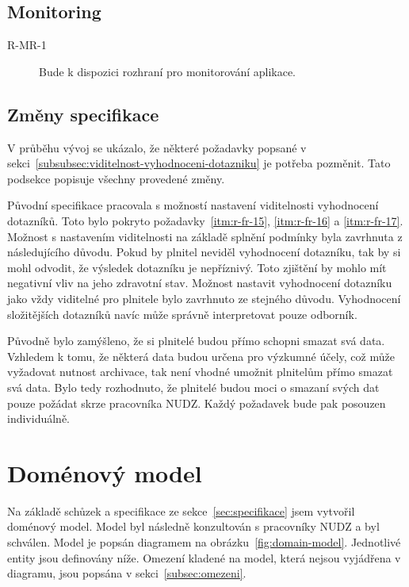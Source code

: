 \subsection{Monitoring}\label{subsec:monitoring}

\begin{description}
    \item[R-MR-1]
    Bude k dispozici rozhraní pro monitorování aplikace.
\end{description}

\subsection{Změny specifikace}\label{subsec:zmeny-specifikace}

V průběhu vývoj se ukázalo, že některé požadavky popsané v sekci~\ref{subsubsec:viditelnost-vyhodnoceni-dotazniku} je potřeba pozměnit.
Tato podsekce popisuje všechny provedené změny.

Původní specifikace pracovala s možností nastavení viditelnosti vyhodnocení dotazníků.
Toto bylo pokryto požadavky~\ref{itm:r-fr-15}, \ref{itm:r-fr-16} a \ref{itm:r-fr-17}.
Možnost s nastavením viditelnosti na základě splnění podmínky byla zavrhnuta z následujícího důvodu.
Pokud by plnitel neviděl vyhodnocení dotazníku, tak by si mohl odvodit, že výsledek dotazníku je nepříznivý.
Toto zjištění by mohlo mít negativní vliv na jeho zdravotní stav.
Možnost nastavit vyhodnocení dotazníku jako vždy viditelné pro plnitele bylo zavrhnuto ze stejného důvodu.
Vyhodnocení složitějších dotazníků navíc může správně interpretovat pouze odborník.

Původně bylo zamýšleno, že si plnitelé budou přímo schopni smazat svá data.
Vzhledem k tomu, že některá data budou určena pro výzkumné účely, což může vyžadovat nutnost archivace, tak není vhodné umožnit plnitelům přímo smazat svá data.
Bylo tedy rozhodnuto, že plnitelé budou moci o smazaní svých dat pouze požádat skrze pracovníka NUDZ\@.
Každý požadavek bude pak posouzen individuálně.


\section{Doménový model}\label{sec:domenovy-model}

Na základě schůzek a specifikace ze sekce~\ref{sec:specifikace} jsem vytvořil doménový model.
Model byl následně konzultován s pracovníky NUDZ a byl schválen.
Model je popsán diagramem na obrázku~\ref{fig:domain-model}.
Jednotlivé entity jsou definovány níže.
Omezení kladené na model, která nejsou vyjádřena v diagramu, jsou popsána v sekci~\ref{subsec:omezeni}.

